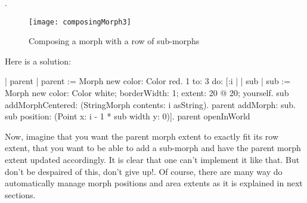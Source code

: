 \documentclass[a4paper,10pt,twoside]{book}
\begin{document}
.

\begin{figure}[htbp]
\begin{center}
	\texttt{[image: composingMorph3]}
	\caption{Composing a morph with a row of sub-morphs}
\end{center}
\end{figure}
Here is a solution:
\begin{code}
| parent |
parent := Morph new color: Color red.
1 to: 3
 do: [:i | 	| sub |
	sub := Morph new color: Color white; borderWidth: 1; extent: 20 @ 20; yourself.
	sub addMorphCentered: (StringMorph contents: i asString).
	parent addMorph: sub.
	sub position: (Point x: i - 1 * sub width y: 0)].
parent openInWorld
\end{code}


Now, imagine that you want the parent morph extent to exactly fit its row extent, that you want to be able to add a sub-morph and have the parent morph extent updated accordingly. It is clear that one can't implement it like that. But don't be despaired of this, don't give up!.  Of course, there are many way do automatically manage morph positions and area extents as it is explained in next sections.
\end{document}
